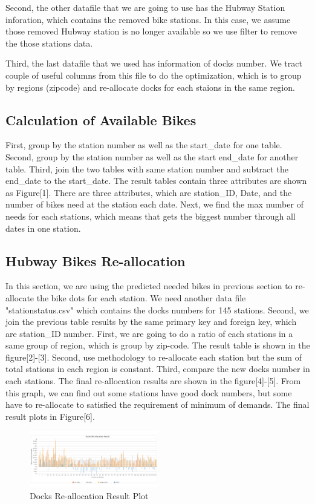 \documentclass[journal, letterpaper]{IEEEtran}
\begin{document}
Second, the other datafile that we are going to use has the Hubway Station inforation, which contains the removed bike stations. In this case, we assume those removed Hubway station is no longer available so we use filter to remove the those stations data. 

Third, the last datafile that we used has information of docks number. We tract couple of useful columns from this file to do the optimization, which is to group by regions (zipcode) and re-allocate docks for each staions in the same region. 

\subsection{Calculation of Available Bikes}
First, group by the station number as well as the start\_date for one table. 
Second, group by the station number as well as the start end\_date for another table.
Third, join the two tables with same station number and subtract the end\_date to the start\_date. 
The result tables contain three attributes are shown as Figure[1]. There are three attributes, which are station\_ID, Date, and the number of bikes need at the station each date. Next, we find the max number of needs for each stations, which means that gets the biggest number through all dates in one station. 

\subsection{Hubway Bikes Re-allocation}
In this section, we are using the predicted needed bikes in previous section to re-allocate the bike dots for each station. We need another data file "stationstatus.csv" which contains the docks numbers for 145 stations. Second, we join the previous table results by the same primary key and foreign key, which are station\_ID number. 
First, we are going to do a ratio of each stations in a same group of region, which is group by zip-code. The result table is shown in the figure[2]-[3]. 
Second, use methodology to re-allocate each station but the sum of total stations in each region is constant. 
Third, compare the new docks number in each stations. The final re-allocation results are shown in the figure[4]-[5]. 
From this graph, we can find out some stations have good dock numbers, but some have to re-allocate to satisfied the requirement of minimum of demands. The final result plots in Figure[6]. 
\begin{figure}
  \includegraphics[width=0.5\textwidth]{refl.png}
  \caption{Docks Re-allocation Result Plot}
  \label{fig:6}
\end{figure}
\end{document}
